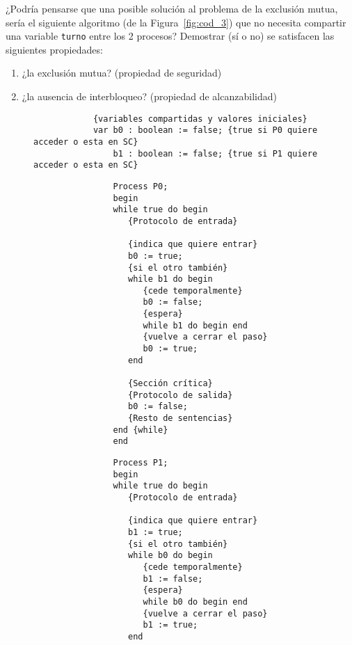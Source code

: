 \begin{ejercicio}\label{ej:2.3}
    ¿Podría pensarse que una posible solución al problema de la exclusión mutua, sería el siguiente algoritmo (de la Figura~\ref{fig:cod_3}) que no necesita compartir una variable \verb|turno| entre los 2 procesos? Demostrar (sí o no) se satisfacen las siguientes propiedades:
    \begin{enumerate}[label=(\alph*)]
        \item ¿la exclusión mutua? (propiedad de seguridad)
        \item ¿la ausencia de interbloqueo? (propiedad de alcanzabilidad)
    \end{enumerate}

    \begin{figure}[H]
        \centering
        \begin{verbatim}
            {variables compartidas y valores iniciales}
            var b0 : boolean := false; {true si P0 quiere acceder o esta en SC}
                b1 : boolean := false; {true si P1 quiere acceder o esta en SC}
        \end{verbatim}
        \setlength{\columnsep}{1cm}
        \begin{multicols}{2}
            \begin{verbatim}
                Process P0;
                begin
                while true do begin
                   {Protocolo de entrada}

                   {indica que quiere entrar}
                   b0 := true;
                   {si el otro también}
                   while b1 do begin
                      {cede temporalmente}
                      b0 := false;
                      {espera}
                      while b1 do begin end
                      {vuelve a cerrar el paso}
                      b0 := true;
                   end

                   {Sección crítica}
                   {Protocolo de salida}
                   b0 := false;
                   {Resto de sentencias}
                end {while}
                end
            \end{verbatim}
            \begin{verbatim}
                Process P1;
                begin
                while true do begin
                   {Protocolo de entrada}

                   {indica que quiere entrar}
                   b1 := true;
                   {si el otro también}
                   while b0 do begin
                      {cede temporalmente}
                      b1 := false;
                      {espera}
                      while b0 do begin end
                      {vuelve a cerrar el paso}
                      b1 := true;
                   end


\end{verbatim}
\end{multicols}
\end{figure}
\end{ejercicio}
